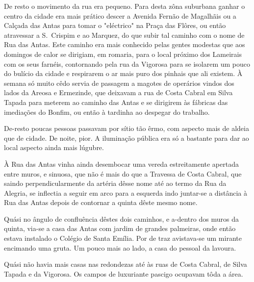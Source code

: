 \documentclass[9pt]{article}
\begin{document}
De resto o movimento da rua era pequeno. Para desta zôna suburbana ganhar o centro da cidade era mais prático descer a Avenida Fernão
de Maga\-lhãis ou a Calçada das Antas para tomar o "eléctrico" na Praça
das Flôres, ou então atravessar a S.\ Crispim e ao Marquez, do que subir
tal caminho com o nome de Rua das Antas. Este caminho era mais conhecido pelas
gentes modestas que aos domingos de calor se dirigiam, em romaria, para
o local próximo dos Lameirais com os seus farnéis, contornando pela rua
da Vigorosa para se isolarem um pouco do bulício da cidade e respirarem o ar mais puro dos pinhais que ali existem. À semana só muito
cêdo servia de passagem a magotes de operários vindos dos lados da
Areosa e Ermezinde, que deixavam a rua de Costa Cabral em Silva Tapada para meterem ao caminho das Antas e se dirigirem às fá\-bri\-cas das
imedia\-ções do Bonfim, ou então à tardinha ao despegar do traba\-lho.

De-resto poucas pessoas passavam por sítio tão êrmo, com aspecto
mais de aldeia que de cidade. De noite, pior. A ilumina\-ção pública era
só a bastante para dar ao local aspecto ainda mais lúgubre.

À Rua das Antas vinha ainda desembocar uma vereda estreitamente
apertada entre muros, e sinuosa, que não é mais do que a Travessa de
Costa Cabral, que saindo perpendicularmente da artéria dêsse nome até ao termo da Rua da Alegria, se inflectia a seguir em arco para a esquerda indo juntar-se a distância à Rua das Antas depois de contornar a quinta
dêste mesmo nome.

Quási no ângulo de confluência dêstes dois caminhos, e a-dentro dos
muros da quinta, via-se a casa das Antas com jardim de gran\-des palmeiras, onde então estava instalado o Colégio de Santa Emília. Por de traz avistava-se um mirante encimando uma gruta. Um pouco mais ao lado, a casa
do pessoal da lavoura.

Quási não havia mais casas nas redondezas até às
ruas de Costa Cabral, de Silva Tapada e da Vigorosa. Os campos de luxuriante pascigo ocupavam tôda a área.
\end{document}
